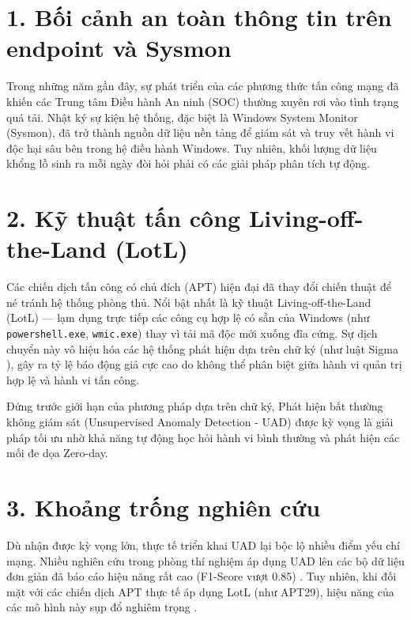 \documentclass[../main.tex]{subfiles}
\begin{document}
\section*{1. Bối cảnh an toàn thông tin trên endpoint và Sysmon}

Trong những năm gần đây, sự phát triển của các phương thức tấn công mạng đã khiến các Trung tâm Điều hành An ninh (SOC) thường xuyên rơi vào tình trạng quá tải. Nhật ký sự kiện hệ thống, đặc biệt là Windows System Monitor (Sysmon), đã trở thành nguồn dữ liệu nền tảng để giám sát và truy vết hành vi độc hại sâu bên trong hệ điều hành Windows. Tuy nhiên, khối lượng dữ liệu khổng lồ sinh ra mỗi ngày đòi hỏi phải có các giải pháp phân tích tự động.

\section*{2. Kỹ thuật tấn công Living-off-the-Land (LotL)}

Các chiến dịch tấn công có chủ đích (APT) hiện đại đã thay đổi chiến thuật để né tránh hệ thống phòng thủ. Nổi bật nhất là kỹ thuật Living-off-the-Land (LotL) — lạm dụng trực tiếp các công cụ hợp lệ có sẵn của Windows (như \texttt{powershell.exe}, \texttt{wmic.exe}) thay vì tải mã độc mới xuống đĩa cứng. Sự dịch chuyển này vô hiệu hóa các hệ thống phát hiện dựa trên chữ ký (như luật Sigma \cite{sigmahq2024}), gây ra tỷ lệ báo động giả cực cao do không thể phân biệt giữa hành vi quản trị hợp lệ và hành vi tấn công. 

Đứng trước giới hạn của phương pháp dựa trên chữ ký, Phát hiện bất thường không giám sát (Unsupervised Anomaly Detection - UAD) được kỳ vọng là giải pháp tối ưu nhờ khả năng tự động học hỏi hành vi bình thường và phát hiện các mối đe dọa Zero-day.

\section*{3. Khoảng trống nghiên cứu}

Dù nhận được kỳ vọng lớn, thực tế triển khai UAD lại bộc lộ nhiều điểm yếu chí mạng. Nhiều nghiên cứu trong phòng thí nghiệm áp dụng UAD lên các bộ dữ liệu đơn giản đã báo cáo hiệu năng rất cao (F1-Score vượt 0.85) \cite{ahmed2016survey, alsaheel2021atlas, han2020unicorn}. Tuy nhiên, khi đối mặt với các chiến dịch APT thực tế áp dụng LotL (như APT29), hiệu năng của các mô hình này sụp đổ nghiêm trọng \cite{smiliotopoulos2025detection, ugea_lmd_2025}. 
\end{document}
